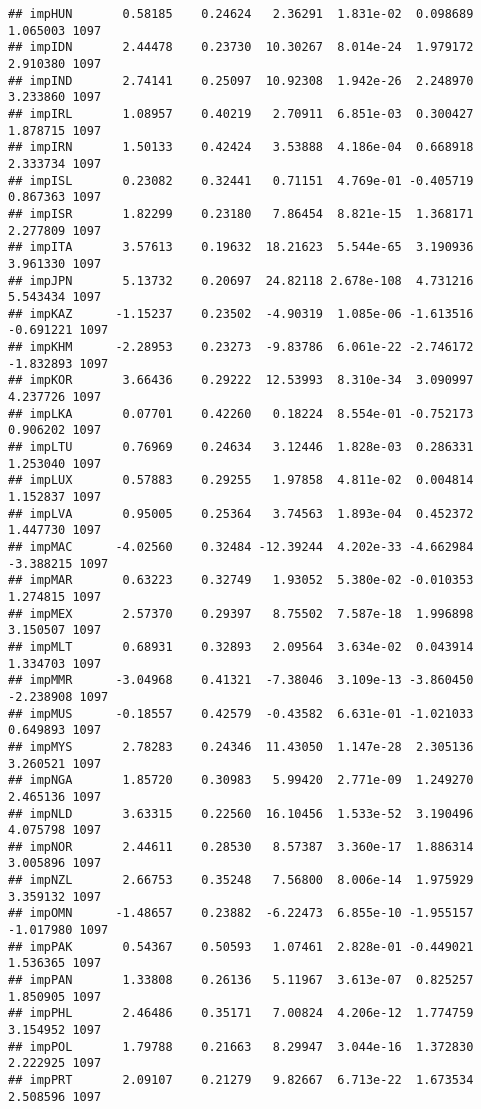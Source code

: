 \documentclass[
]{article}
\begin{document}
\begin{verbatim}
## impHUN       0.58185    0.24624   2.36291  1.831e-02  0.098689  1.065003 1097
## impIDN       2.44478    0.23730  10.30267  8.014e-24  1.979172  2.910380 1097
## impIND       2.74141    0.25097  10.92308  1.942e-26  2.248970  3.233860 1097
## impIRL       1.08957    0.40219   2.70911  6.851e-03  0.300427  1.878715 1097
## impIRN       1.50133    0.42424   3.53888  4.186e-04  0.668918  2.333734 1097
## impISL       0.23082    0.32441   0.71151  4.769e-01 -0.405719  0.867363 1097
## impISR       1.82299    0.23180   7.86454  8.821e-15  1.368171  2.277809 1097
## impITA       3.57613    0.19632  18.21623  5.544e-65  3.190936  3.961330 1097
## impJPN       5.13732    0.20697  24.82118 2.678e-108  4.731216  5.543434 1097
## impKAZ      -1.15237    0.23502  -4.90319  1.085e-06 -1.613516 -0.691221 1097
## impKHM      -2.28953    0.23273  -9.83786  6.061e-22 -2.746172 -1.832893 1097
## impKOR       3.66436    0.29222  12.53993  8.310e-34  3.090997  4.237726 1097
## impLKA       0.07701    0.42260   0.18224  8.554e-01 -0.752173  0.906202 1097
## impLTU       0.76969    0.24634   3.12446  1.828e-03  0.286331  1.253040 1097
## impLUX       0.57883    0.29255   1.97858  4.811e-02  0.004814  1.152837 1097
## impLVA       0.95005    0.25364   3.74563  1.893e-04  0.452372  1.447730 1097
## impMAC      -4.02560    0.32484 -12.39244  4.202e-33 -4.662984 -3.388215 1097
## impMAR       0.63223    0.32749   1.93052  5.380e-02 -0.010353  1.274815 1097
## impMEX       2.57370    0.29397   8.75502  7.587e-18  1.996898  3.150507 1097
## impMLT       0.68931    0.32893   2.09564  3.634e-02  0.043914  1.334703 1097
## impMMR      -3.04968    0.41321  -7.38046  3.109e-13 -3.860450 -2.238908 1097
## impMUS      -0.18557    0.42579  -0.43582  6.631e-01 -1.021033  0.649893 1097
## impMYS       2.78283    0.24346  11.43050  1.147e-28  2.305136  3.260521 1097
## impNGA       1.85720    0.30983   5.99420  2.771e-09  1.249270  2.465136 1097
## impNLD       3.63315    0.22560  16.10456  1.533e-52  3.190496  4.075798 1097
## impNOR       2.44611    0.28530   8.57387  3.360e-17  1.886314  3.005896 1097
## impNZL       2.66753    0.35248   7.56800  8.006e-14  1.975929  3.359132 1097
## impOMN      -1.48657    0.23882  -6.22473  6.855e-10 -1.955157 -1.017980 1097
## impPAK       0.54367    0.50593   1.07461  2.828e-01 -0.449021  1.536365 1097
## impPAN       1.33808    0.26136   5.11967  3.613e-07  0.825257  1.850905 1097
## impPHL       2.46486    0.35171   7.00824  4.206e-12  1.774759  3.154952 1097
## impPOL       1.79788    0.21663   8.29947  3.044e-16  1.372830  2.222925 1097
## impPRT       2.09107    0.21279   9.82667  6.713e-22  1.673534  2.508596 1097

\end{verbatim}
\end{document}

